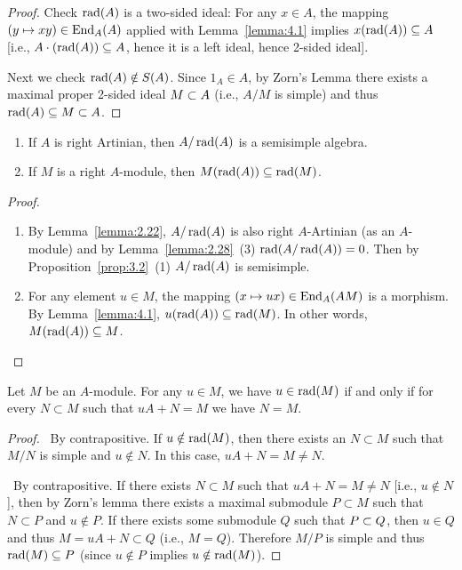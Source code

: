 \begin{proof}
Check $\operatorname{rad}(A)$ is a two-sided ideal: For any $x\in A$, the mapping
$(y\mapsto xy)\in\operatorname{End}_{A}(A)$ applied with Lemma~\ref{lemma:4.1}
implies $x(\operatorname{rad}(A))\subseteq A$ [i.e., $A\cdot(\operatorname{rad}(A))\subseteq A$,
hence it is a left ideal, hence 2-sided ideal].
  
Next we check $\operatorname{rad}(A)\notin S(A)$. Since $1_{A}\in A$, by Zorn's Lemma
there exists a maximal proper 2-sided ideal $M\propersubset A$ (i.e.,
$A/M$ is simple) and thus $\Rad(A)\subset M\propersubset A$.
\end{proof}

\begin{corollary}\label{cor:4.3}
\begin{enumerate}
\item If $A$ is right Artinian, then $A/\operatorname{rad}(A)$ is a semisimple algebra.
\item If $M$ is a right $A$-module, then $M(\operatorname{rad}(A))\subseteq\operatorname{rad}(M)$.
\end{enumerate}
\end{corollary}

\begin{proof}
\begin{enumerate}
\item By Lemma~\ref{lemma:2.22}, $A/\operatorname{rad}(A)$ is also right
  $A$-Artinian (as an $A$-module) and by Lemma~\ref{lemma:2.28}~(3)
  $\operatorname{rad}(A/\operatorname{rad}(A))=0$. Then by Proposition~\ref{prop:3.2}~(1)
  $A/\operatorname{rad}(A)$ is semisimple.
\item For any element $u\in M$, the mapping $(x\mapsto ux)\in\operatorname{End}_{A}(AM)$
  is a morphism. By Lemma~\ref{lemma:4.1},
  $u(\operatorname{rad}(A))\subseteq\operatorname{rad}(M)$. In other words, $M(\operatorname{rad}(A))\subseteq M$.
\end{enumerate}
\end{proof}

\begin{lemma}\label{lemma:4.4}
Let $M$ be an $A$-module. For any $u\in M$, we have $u\in\operatorname{rad}(M)$ if
and only if for every $N\subset M$ such that $uA+N=M$ we have $N=M$.
\end{lemma}

\begin{proof}
\backwardproof\ By contrapositive. If $u\notin\operatorname{rad}(M)$, then there
exists an $N\subset M$ such that $M/N$ is simple and $u\notin N$. In
this case, $uA+N=M\neq N$.

\forwardproof\ By contrapositive. If there exists $N\subset M$ such
that $uA+N=M\neq N$ [i.e., $u\notin N$], then by Zorn's lemma there
exists a maximal submodule $P\subset M$ such that $N\subset P$ and
$u\notin P$. If there exists some submodule $Q$ such that
$P\propersubset Q$, then $u\in Q$ and thus $M=uA+N\subset Q$ (i.e., $M=Q$).
Therefore $M/P$ is simple and thus $\operatorname{rad}(M)\subseteq P$ (since $u\notin P$
implies $u\notin\operatorname{rad}(M)$).
\end{proof}

